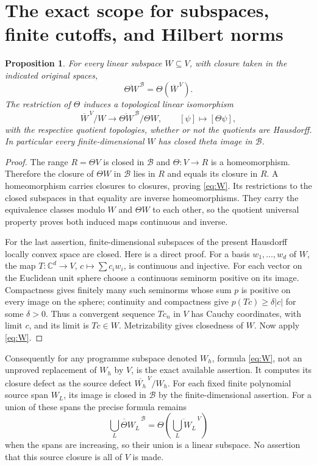 \documentclass[11pt]{article}
\newtheorem{proposition}[theorem]{Proposition}
\newcommand{\B}{\mathscr B}
\newcommand{\C}{\mathbb C}
\begin{document}
\section{The exact scope for subspaces, finite cutoffs, and Hilbert norms}

\begin{proposition}\label{prop:subspace}
For every linear subspace $W\subseteq V$, with closure taken in the
indicated original spaces,
\begin{equation}\label{eq:W}
 \overline{\Theta W}^{\,\B}
       =\Theta\left(\overline W^{\,V}\right).
\end{equation}
The restriction of $\Theta$ induces a topological linear isomorphism
\[
 \overline W^{\,V}/W
       \longrightarrow\overline{\Theta W}^{\,\B}/\Theta W,
 \qquad[\psi]\longmapsto[\Theta\psi],
\]
with the respective quotient topologies, whether or not the quotients
are Hausdorff. In particular every finite-dimensional $W$ has closed
theta image in $\B$.
\end{proposition}

\begin{proof}
The range $R=\Theta V$ is closed in $\B$ and $\Theta:V\to R$ is a
homeomorphism. Therefore the closure of $\Theta W$ in $\B$ lies in
$R$ and equals its closure in $R$. A homeomorphism carries closures
to closures, proving \eqref{eq:W}. Its restrictions to the closed
subspaces in that equality are inverse homeomorphisms. They carry
the equivalence classes modulo $W$ and $\Theta W$ to each other,
so the quotient universal property proves both induced maps
continuous and inverse.

For the last assertion, finite-dimensional subspaces of the present
Hausdorff locally convex space are closed. Here is a direct proof.
For a basis $w_1,\ldots,w_d$ of $W$, the map
$T:\C^d\to V$, $c\mapsto\sum c_iw_i$, is continuous and injective.
For each vector on the Euclidean unit sphere choose a continuous
seminorm positive on its image. Compactness gives finitely many
such seminorms whose sum $p$ is positive on every image on the
sphere; continuity and compactness give $p(Tc)\geq\delta|c|$ for
some $\delta>0$. Thus a convergent sequence $Tc_n$ in $V$ has
Cauchy coordinates, with limit $c$, and its limit is $Tc\in W$.
Metrizability gives closedness of $W$. Now apply \eqref{eq:W}.
\end{proof}

Consequently for any programme subspace denoted $W_h$, formula
\eqref{eq:W}, not an unproved replacement of $W_h$ by $V$, is the
exact available assertion. It computes its closure defect as the
source defect $\overline{W_h}^{\,V}/W_h$. For each fixed finite
polynomial source span $W_L$, its image is closed in $\B$ by the
finite-dimensional assertion. For a union of these spans the precise
formula remains
\[
 \overline{\bigcup_L\Theta W_L}^{\,\B}
    =\Theta\left(\overline{\bigcup_L W_L}^{\,V}\right)
\]
when the spans are increasing, so their union is a linear subspace.
No assertion that this source closure is all of $V$ is made.
\end{document}
